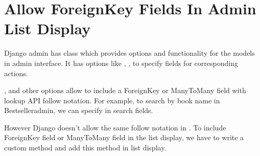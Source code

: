 \documentclass[letterpaper,12pt,english]{sphinxmanual}
\begin{document}
\chapter{Allow ForeignKey Fields In Admin List Display}
\label{\detokenize{admin_list_display_foreignkey:allow-foreignkey-fields-in-admin-list-display}}\label{\detokenize{admin_list_display_foreignkey::doc}}
Django admin has  class which provides options and functionality for the models in admin interface. It has options like , ,  to specify fields for corresponding actions.

,  and other options allow to include a ForeignKey or ManyToMany field with lookup API follow notation. For example, to search by book name in Bestselleradmin, we can specify  in search fields.

\begin{sphinxVerbatim}[commandchars=\\\{\}]
   

   


 
       
         


 
\end{sphinxVerbatim}

However Django doesn’t allow the same follow notation in . To include ForeignKey field or ManyToMany field in the list display, we have to write a custom method and add this method in list display.
\end{document}
